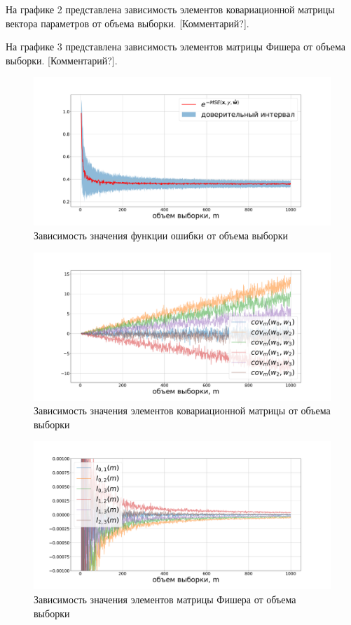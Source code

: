 \documentclass[12pt,twoside]{article}
\begin{document}
На графике 2 представлена зависимость элементов ковариационной матрицы вектора параметров от объема выборки. [Комментарий?].

На графике 3 представлена зависимость элементов матрицы Фишера от объема выборки. [Комментарий?].

\begin{figure}[h!t]\center
\includegraphics[width=1\textwidth]{../data/pics/synthetic_S.pdf}
\caption{Зависимость значения функции ошибки от объема выборки}
\label{fig1}
\end{figure}

\begin{figure}[h!t]\center
\includegraphics[width=1\textwidth]{../data/pics/synthetic_W.pdf}
\caption{Зависимость значения элементов ковариационной матрицы от объема выборки}
\label{fig2}
\end{figure}

\begin{figure}[h!t]\center
\includegraphics[width=1\textwidth]{../data/pics/synthetic_I.pdf}
\caption{Зависимость значения элементов матрицы Фишера от объема выборки}
\label{fig3}
\end{figure}
\end{document}
